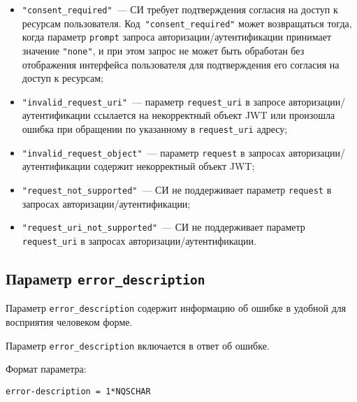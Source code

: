 \begin{itemize}
\item
\lstinline{"consent_required"}~--- 
СИ требует подтверждения согласия на доступ к ресурсам пользователя.
%
Код~\lstinline{"consent_required"} может возвращаться тогда, когда 
параметр \lstinline{prompt} запроса авторизации/аутентификации 
принимает значение \lstinline{"none"}, и при этом запрос не 
может быть обработан без отображения интерфейса пользователя для подтверждения  
его согласия на доступ к ресурсам; 

\item
\lstinline{"invalid_request_uri"}~---
параметр \lstinline{request_uri} в запросе авторизации/аутентификации 
ссылается на некорректный объект JWT или произошла ошибка при обращении  
по указанному в \lstinline{request_uri} адресу; 

\item
\lstinline{"invalid_request_object"}~--- 
параметр \lstinline{request} в запросах авторизации/аутентификации содержит 
некорректный объект JWT; 

\item
\lstinline{"request_not_supported"}~---
СИ не поддерживает параметр \lstinline{request} в запросах 
авторизации/аутентификации;

\item
\lstinline{"request_uri_not_supported"}~---
СИ не поддерживает параметр \lstinline{request_uri} в запросах 
авторизации/аутентификации.
\end{itemize}


\subsection{Параметр \lstinline{error_description}}\label{PARAMS.ErrorDescr}

Параметр \lstinline{error_description} содержит информацию об ошибке в удобной 
для восприятия человеком форме.

Параметр \lstinline{error_description} включается в ответ об ошибке.


Формат параметра:
\begin{lstlisting}
error-description = 1*NQSCHAR
\end{lstlisting}

